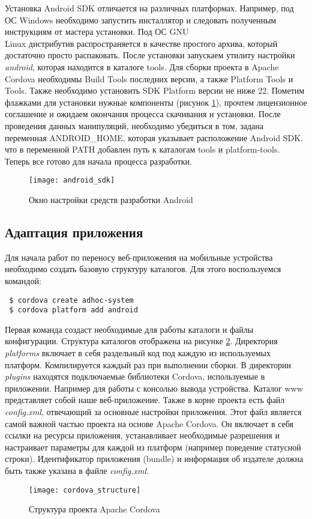 Установка Android SDK отличается на различных платформах. Например, под ОС Windows необходимо запустить инсталлятор и следовать полученным инструкциям от мастера установки. Под ОС GNU\\Linux дистрибутив распространяется в качестве простого архива, который достаточно просто распаковать. После установки запускаем утилиту настройки \textit{android}, которая находится в каталоге tools. Для сборки проекта в Apache Cordova необходимы Build Tools последних версии, а также Platform Tools и Tools. Также необходимо установить SDK Platform версии не ниже 22. Пометим флажками для установки нужные компоненты (рисунок \ref{android_sdk}), прочтем лицензионное соглашение и ожидаем окончания процесса скачивания и установки. После проведения данных манипуляций, необходимо убедиться в том, задана переменная ANDROID\_HOME, которая указывает расположение Android SDK. что в переменной PATH добавлен путь к каталогам tools и platform-tools. Теперь все готово для начала процесса разработки.
\begin{figure}[ht]
\center\texttt{[image: android\_sdk]}
\caption{Окно настройки средств разработки Android}\label{android_sdk}
\end{figure}

\subsection{Адаптация приложения}
Для начала работ по переносу веб-приложения на мобильные устройства необходимо создать базовую структуру каталогов. Для этого воспользуемся командой:
\begin{lstlisting}
 $ cordova create adhoc-system
 $ cordova platform add android
\end{lstlisting}

Первая команда создаст необходимые для работы каталоги и файлы конфигурации. Структура каталогов отображена на рисунке \ref{cordova_structure}. Директория \textit{platforms} включает в себя раздельный код под каждую из используемых платформ. Компилируется каждый раз при выполнении сборки. В директории \textit{plugins} находятся подключаемые библиотеки Cordova, используемые в приложении. Например для работы с консолью вывода устройства. Каталог www представляет собой наше веб-приложение. Также в корне проекта есть файл \textit{config.xml}, отвечающий за основные настройки приложения. Этот файл является самой важной частью проекта на основе Apache Cordova. Он включает в себя ссылки на ресурсы приложения, устанавливает необходимые разрешения и настраивает параметры для каждой из платформ (например поведение статусной строки). Идентификатор приложения (bundle) и информация об издателе должна быть также указана в файле \textit{config.xml}.
\begin{figure}[ht]
\center\texttt{[image: cordova\_structure]}
\caption{Структура проекта Apache Cordova}\label{cordova_structure}
\end{figure}

